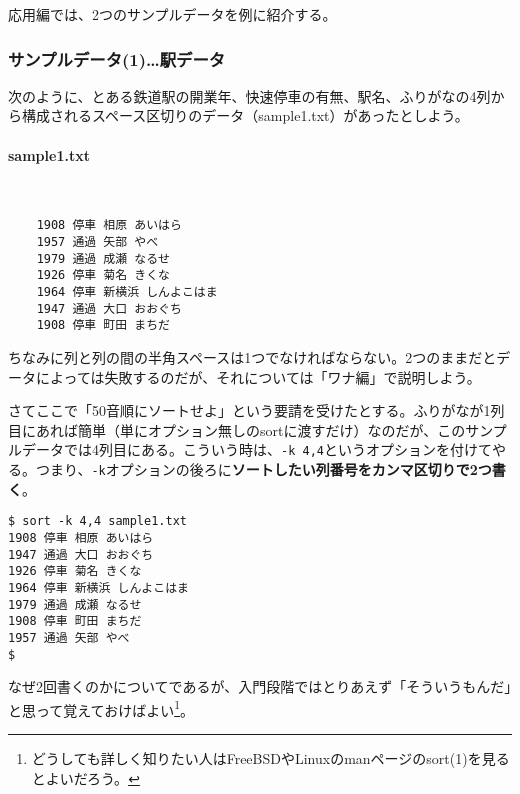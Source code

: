 応用編では、2つのサンプルデータを例に紹介する。

\subsubsection*{サンプルデータ(1)…駅データ}

次のように、とある鉄道駅の開業年、快速停車の有無、駅名、ふりがなの4列から構成されるスペース区切りのデータ（sample1.txt）があったとしよう。
\paragraph{sample1.txt}　\\
\begin{frameboxit}{160.0mm}
\begin{verbatim}
	1908 停車 相原 あいはら
	1957 通過 矢部 やべ
	1979 通過 成瀬 なるせ
	1926 停車 菊名 きくな
	1964 停車 新横浜 しんよこはま
	1947 通過 大口 おおぐち
	1908 停車 町田 まちだ
\end{verbatim}
\end{frameboxit}

ちなみに列と列の間の半角スペースは1つでなければならない。2つのままだとデータによっては失敗するのだが、それについては「ワナ編」で説明しよう。

さてここで「50音順にソートせよ」という要請を受けたとする。ふりがなが1列目にあれば簡単（単にオプション無しのsortに渡すだけ）なのだが、このサンプルデータでは4列目にある。こういう時は、\verb|-k 4,4|というオプションを付けてやる。つまり、\verb|-k|オプションの後ろに\textbf{ソートしたい列番号をカンマ区切りで2つ書く}。
\begin{screen}
	\verb!$ sort -k 4,4 sample1.txt! \return \\
	\verb!1908 停車 相原 あいはら! \\
	\verb!1947 通過 大口 おおぐち! \\
	\verb!1926 停車 菊名 きくな! \\
	\verb!1964 停車 新横浜 しんよこはま! \\
	\verb!1979 通過 成瀬 なるせ! \\
	\verb!1908 停車 町田 まちだ! \\
	\verb!1957 通過 矢部 やべ! \\
	\verb!$ !
\end{screen}

なぜ2回書くのかについてであるが、入門段階ではとりあえず「そういうもんだ」と思って覚えておけばよい\footnote{どうしても詳しく知りたい人はFreeBSDやLinuxのmanページのsort(1)を見るとよいだろう。}。

